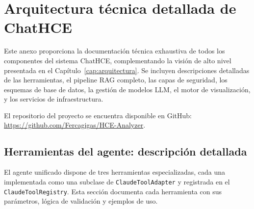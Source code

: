 %

\chapter{Arquitectura técnica detallada de ChatHCE}
\label{appendix:arquitectura}

Este anexo proporciona la documentación técnica exhaustiva de todos los componentes del sistema ChatHCE, complementando la visión de alto nivel presentada en el Capítulo~\ref{cap:arquitectura}. Se incluyen descripciones detalladas de las herramientas, el pipeline \ac{RAG} completo, las capas de seguridad, los esquemas de base de datos, la gestión de modelos \ac{LLM}, el motor de visualización, y los servicios de infraestructura.

El repositorio del proyecto se encuentra disponible en GitHub: \url{https://github.com/Fercagigas/HCE-Analyzer}.

\section{Herramientas del agente: descripción detallada}
\label{sec:appendix_herramientas}

El agente unificado dispone de tres herramientas especializadas, cada una implementada como una subclase de \texttt{ClaudeToolAdapter} y registrada en el \texttt{ClaudeToolRegistry}. Esta sección documenta cada herramienta con sus parámetros, lógica de validación y ejemplos de uso.

